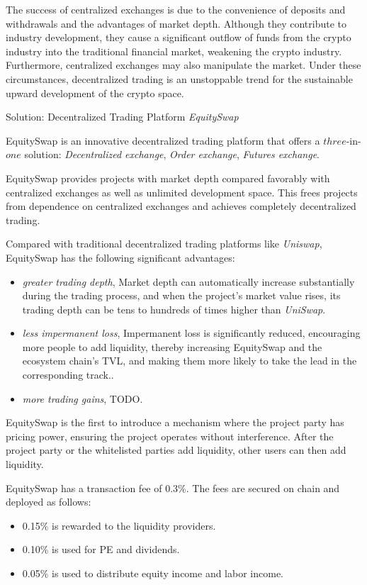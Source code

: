 \documentclass{article}
\begin{document}
The success of centralized exchanges is due to the convenience of deposits and withdrawals and the advantages of market depth. Although they contribute to industry development, they cause a significant outflow of funds from the crypto industry into the traditional financial market, weakening the crypto industry. Furthermore, centralized exchanges may also manipulate the market. Under these circumstances, decentralized trading is an unstoppable trend for the sustainable upward development of the crypto space.

Solution: Decentralized Trading Platform \emph{EquitySwap}

EquitySwap is an innovative decentralized trading platform that offers a $three$-in-$one$ solution: \emph{Decentralized exchange}, \emph{Order exchange}, \emph{Futures exchange}.

EquitySwap provides projects with market depth compared favorably with centralized exchanges as well as unlimited development space. This frees projects from dependence on centralized exchanges and achieves completely decentralized trading.

Compared with traditional decentralized trading platforms like \emph{Uniswap}, EquitySwap has the following significant advantages: 

\begin{itemize}
   \item \emph{greater trading depth}, Market depth can automatically increase substantially during the trading process, and when the project's market value rises, its trading depth can be tens to hundreds of times higher than \emph{UniSwap}.
   \item \emph{less impermanent loss}, Impermanent loss is significantly reduced, encouraging more people to add liquidity, thereby increasing EquitySwap and the ecosystem chain's TVL, and making them more likely to take the lead in the corresponding track..
   \item \emph{more trading gains}, TODO.
\end{itemize}

EquitySwap is the first to introduce a mechanism where the project party has pricing power, ensuring the project operates without interference. After the project party or the whitelisted parties add liquidity, other users can then add liquidity. 

EquitySwap has a transaction fee of 0.3\%. The fees are secured on chain and deployed as follows: 

\begin{itemize}
   \item 0.15\% is rewarded to the liquidity providers.
   \item 0.10\% is used for PE and dividends.
   \item 0.05\% is used to distribute equity income and labor income.  
\end{itemize}
\end{document}
